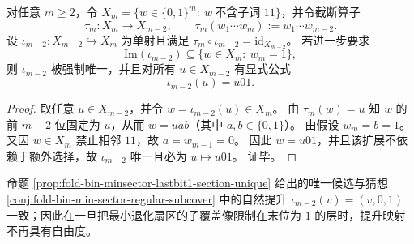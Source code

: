 \begin{proposition}[末位约束下的截断右逆唯一性]\label{prop:fold-bin-minsector-lastbit1-section-unique}
对任意 \(m\ge 2\)，令 \(X_m=\{w\in\{0,1\}^m:\ w\ \text{不含子词 }11\}\)，并令截断算子
\[
\tau_m:X_m\to X_{m-2},
\qquad
\tau_m(w_1\cdots w_m):=w_1\cdots w_{m-2}.
\]
设 \(\iota_{m-2}:X_{m-2}\hookrightarrow X_m\) 为单射且满足 \(\tau_m\circ \iota_{m-2}=\mathrm{id}_{X_{m-2}}\)。
若进一步要求
\[
\mathrm{Im}(\iota_{m-2})\subseteq \{w\in X_m:\ w_m=1\},
\]
则 \(\iota_{m-2}\) 被强制唯一，并且对所有 \(u\in X_{m-2}\) 有显式公式
\[
\iota_{m-2}(u)=u01.
\]
\end{proposition}
\begin{proof}
取任意 \(u\in X_{m-2}\)，并令 \(w=\iota_{m-2}(u)\in X_m\)。
由 \(\tau_m(w)=u\) 知 \(w\) 的前 \(m-2\) 位固定为 \(u\)，从而 \(w=uab\)（其中 \(a,b\in\{0,1\}\)）。
由假设 \(w_m=b=1\)。
又因 \(w\in X_m\) 禁止相邻 \(11\)，故 \(a=w_{m-1}=0\)。
因此 \(w=u01\)，并且该扩展不依赖于额外选择，故 \(\iota_{m-2}\) 唯一且必为 \(u\mapsto u01\)。
证毕。
\end{proof}

\begin{remark}
命题 \ref{prop:fold-bin-minsector-lastbit1-section-unique} 给出的唯一候选与猜想 \ref{conj:fold-bin-min-sector-regular-subcover} 中的自然提升 \(\iota_{m-2}(v)=(v,0,1)\) 一致；因此在一旦把最小退化扇区的子覆盖像限制在末位为 \(1\) 的层时，提升映射不再具有自由度。
\end{remark}

